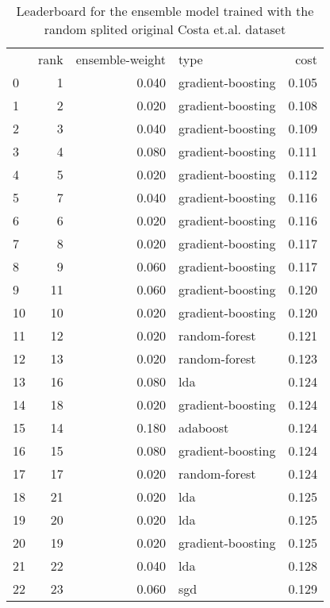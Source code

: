\begin{table}[]
	\centering
	\begin{tabular}{lrrlr}
		   & rank & ensemble-weight & type              & cost  \\
		0  & 1    & 0.040           & gradient-boosting & 0.105 \\
		1  & 2    & 0.020           & gradient-boosting & 0.108 \\
		2  & 3    & 0.040           & gradient-boosting & 0.109 \\
		3  & 4    & 0.080           & gradient-boosting & 0.111 \\
		4  & 5    & 0.020           & gradient-boosting & 0.112 \\
		5  & 7    & 0.040           & gradient-boosting & 0.116 \\
		6  & 6    & 0.020           & gradient-boosting & 0.116 \\
		7  & 8    & 0.020           & gradient-boosting & 0.117 \\
		8  & 9    & 0.060           & gradient-boosting & 0.117 \\
		9  & 11   & 0.060           & gradient-boosting & 0.120 \\
		10 & 10   & 0.020           & gradient-boosting & 0.120 \\
		11 & 12   & 0.020           & random-forest     & 0.121 \\
		12 & 13   & 0.020           & random-forest     & 0.123 \\
		13 & 16   & 0.080           & lda               & 0.124 \\
		14 & 18   & 0.020           & gradient-boosting & 0.124 \\
		15 & 14   & 0.180           & adaboost          & 0.124 \\
		16 & 15   & 0.080           & gradient-boosting & 0.124 \\
		17 & 17   & 0.020           & random-forest     & 0.124 \\
		18 & 21   & 0.020           & lda               & 0.125 \\
		19 & 20   & 0.020           & lda               & 0.125 \\
		20 & 19   & 0.020           & gradient-boosting & 0.125 \\
		21 & 22   & 0.040           & lda               & 0.128 \\
		22 & 23   & 0.060           & sgd               & 0.129 \\
	\end{tabular}

	\caption{Leaderboard for the ensemble model trained with the random splited original Costa et.al. dataset}
	\label{tab:lb-from-costaetal-randsplit}
\end{table}

